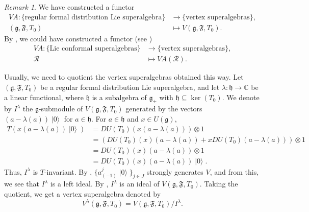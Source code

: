 \documentclass[a4paper, 12pt, reqno]{amsart}
\theoremstyle{remark}
\newtheorem{remark}[theorem]{Remark}
\numberwithin{equation}{subsection}
\DeclareMathOperator{\vac}{|0\rangle}
\begin{document}
\begin{remark}
  \label{rmk:15}
  We have constructed a functor
  \begin{align*}
    VA: \{\text{regular formal distribution Lie superalgebra}\} &\to \{\text{vertex superalgebras}\}, \\
    (\mathfrak{g}, \mathfrak{F}, T_0) &\mapsto V(\mathfrak{g}, \mathfrak{F}, T_0).
  \end{align*}
  By , we could have constructed a functor (see \cite[Theorem 2.15]{li_vertex_2004})
  \begin{align*}
    VA: \{\text{Lie conformal superalgebras}\} &\to \{\text{vertex superalgebras}\}, \\
    \mathcal{R} &\mapsto VA(\mathcal{R}).
  \end{align*}
\end{remark}

Usually, we need to quotient the vertex superalgebras obtained this way.
Let $(\mathfrak{g}, \mathfrak{F}, T_0)$ be a regular formal distribution Lie superalgebra, and let $\lambda: \mathfrak{h} \to \mathbb{C}$ be a linear functional, where $\mathfrak{h}$ is a subalgebra of $\mathfrak{g}_+$ with $\mathfrak{h} \subseteq \ker(T_0)$.
We denote by $I^{\lambda}$ the $\mathfrak{g}$-submodule of $V(\mathfrak{g}, \mathfrak{F}, T_0)$ generated by the vectors $(a - \lambda(a))\vac$ for $a \in \mathfrak{h}$.
For $a \in \mathfrak{h}$ and $x \in U(\mathfrak{g})$,
\begin{align*}
  T(x(a - \lambda(a))\vac) &= DU(T_0)(x(a - \lambda(a)))\otimes1 \\
  &= (DU(T_0)(x)(a - \lambda(a)) + xDU(T_0)(a - \lambda(a)))\otimes1 \\
  &= DU(T_0)(x)(a - \lambda(a))\otimes1 \\
  &= DU(T_0)(x)(a - \lambda(a))\vac.
\end{align*}
Thus, $I^{\lambda}$ is $T$-invariant.
By , $\{a^j_{(-1)}\vac\}_{j \in J}$ strongly generates $V$, and from this, we see that $I^{\lambda}$ is a left ideal.
By , $I^{\lambda}$ is an ideal of $V(\mathfrak{g}, \mathfrak{F}, T_0)$.
Taking the quotient, we get a vertex superalgebra denoted by
\begin{equation*}
  V^{\lambda}(\mathfrak{g}, \mathfrak{F}, T_0) = V(\mathfrak{g}, \mathfrak{F}, T_0)/I^{\lambda}.
\end{equation*}
\end{document}
